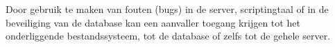 Door gebruik te maken van fouten (bugs) in de server, scriptingtaal of in de beveiliging van de database kan een aanvaller toegang krijgen tot het onderliggende bestandssysteem, tot de database of zelfs tot de gehele server.
